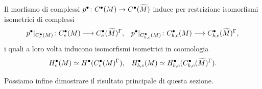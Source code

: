 \begin{lemma}
Il morfismo di complessi $\map{p^\bul}{C^\bul(M)}{C^\bul(\widetilde M)}$ induce per restrizione isomorfismi isometrici di complessi
\begin{align*}
\map{p^\bul|_{C^\bul_c(M)}}{C^\bul_c(M)}{C^\bul_c(\widetilde M)^\Gamma},&&\map{p^\bul|_{C^\bul_{b,c}(M)}}{C^\bul_{b,c}(M)}{C^\bul_{b,c}(\widetilde M)^\Gamma},
\end{align*}
i quali a loro volta inducono isomorfismi isometrici in coomologia
\begin{align*}
H^\bullet_c(M)\simeq H^\bullet(C^\bullet_c(M)^\Gamma),&&H^\bullet_{b,c}(M)\simeq H^\bullet_{b,c}(C^\bullet_{b,c}(\widetilde M)^\Gamma).
\end{align*}
\end{lemma}

Possiamo infine dimostrare il risultato principale di questa sezione.

